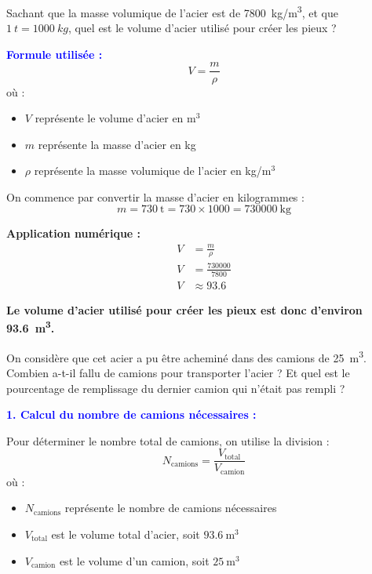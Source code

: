 \documentclass[answers]{exam}
\begin{document}
  \begin{questions}

    \question[1] Sachant que la masse volumique de l'acier est de \SI{7800}{kg/m^3}, et que $ \SI{1}{t} = \SI{1000}{kg}$, quel est le volume d'acier utilisé pour créer les pieux ?
    \begin{solution}
      \textcolor{blue}{\textbf{Formule utilisée :}}
      \[
      V = \frac{m}{\rho}
      \]
      où :
      \begin{addmargin}[4em]{1em}
        \begin{itemize}[noitemsep]
            \item \( V \) représente le volume d'acier en m$^3$
            \item \( m \) représente la masse d'acier en kg
            \item \( \rho \) représente la masse volumique de l'acier en kg/m$^3$
        \end{itemize}
      \end{addmargin}
      \vspace{1em}
  
      On commence par convertir la masse d'acier en kilogrammes :  
      \[
      m = 730 \ \text{t} = 730 \times 1000 = 730000 \ \text{kg}
      \]
  
      \textbf{Application numérique :}
      \begin{align*}
        V &= \frac{m}{\rho} \\
        V &= \frac{730000}{7800} \\
        V &\approx 93.6
      \end{align*}
  
      \textbf{Le volume d'acier utilisé pour créer les pieux est donc d'environ \SI{93.6}{m^3}.}
    \end{solution}
  
    \question[1] On considère que cet acier a pu être acheminé dans des camions de \SI{25}{m^3}. Combien a-t-il fallu de camions pour transporter l'acier ? Et quel est le pourcentage de remplissage du dernier camion qui n'était pas rempli ?
    \begin{solution}
      \textcolor{blue}{\textbf{1. Calcul du nombre de camions nécessaires :}}
  
      Pour déterminer le nombre total de camions, on utilise la division :  
      \[
      N_{\text{camions}} = \frac{V_{\text{total}}}{V_{\text{camion}}}
      \]
      où :
      \begin{addmargin}[4em]{1em}
        \begin{itemize}[noitemsep]
            \item \( N_{\text{camions}} \) représente le nombre de camions nécessaires
            \item \( V_{\text{total}} \) est le volume total d'acier, soit \( 93.6 \ \text{m}^3 \)
            \item \( V_{\text{camion}} \) est le volume d'un camion, soit \( 25 \ \text{m}^3 \)
        \end{itemize}
      \end{addmargin}
  

\end{solution}
\end{questions}
\end{document}
